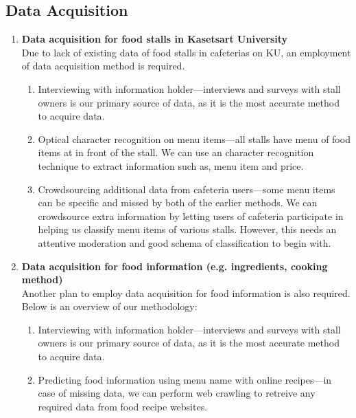 \subsection{Data Acquisition}
\label{subsection:data-acquisition}

\begin{enumerate}[leftmargin=80pt]
    \item \textbf{Data acquisition for food stalls in Kasetsart University} \\%
        Due to lack of existing data of food stalls in cafeterias on KU, an employment of data acquisition method is required.
        \begin{enumerate}
            \item Interviewing with information holder---interviews and surveys with stall owners is our
            primary source of data, as it is the most accurate method to acquire data.
            \item Optical character recognition on menu items---all stalls have menu of food items at in front of the stall.
            We can use an character recognition technique to extract information such as, menu item and price.
            \item Crowdsourcing additional data from cafeteria users---some menu items can be specific and missed by
            both of the earlier methods. We can crowdsource extra information by letting users of cafeteria participate
            in helping us classify menu items of various stalls. However, this needs an attentive moderation and
            good schema of classification to begin with.
        \end{enumerate}
    \item \textbf{Data acquisition for food information (e.g. ingredients, cooking method)} \\%
        Another plan to employ data acquisition for food information is also required. Below is an overview of our methodology:
        \begin{enumerate}
            \item Interviewing with information holder---interviews and surveys with stall owners is our
            primary source of data, as it is the most accurate method to acquire data.
            \item Predicting food information using menu name with online recipes---in case of missing data, we can perform
            web crawling to retreive any required data from food recipe websites.
        \end{enumerate}
\end{enumerate}

